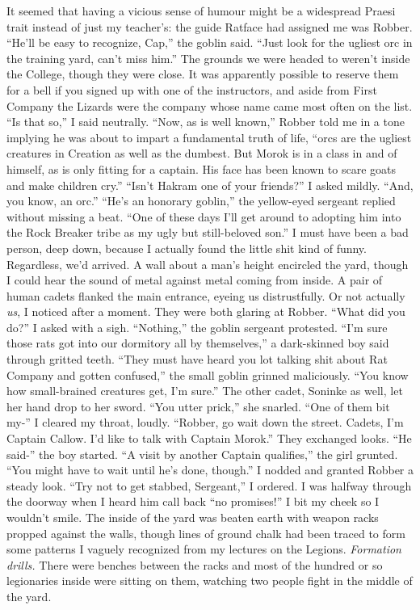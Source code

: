 \documentclass[12pt, openany]{book}
\begin{document}
It seemed that having a vicious sense of humour might be a widespread Praesi trait instead of just my teacher’s: the guide Ratface had assigned me was Robber.
“He’ll be easy to recognize, Cap,” the goblin said. “Just look for the ugliest orc in the training yard, can’t miss him.”
The grounds we were headed to weren’t inside the College, though they were close. It was apparently possible to reserve them for a bell if you signed up with one of the instructors, and aside from First Company the Lizards were the company whose name came most often on the list.
“Is that so,” I said neutrally.
“Now, as is well known,” Robber told me in a tone implying he was about to impart a fundamental truth of life, “orcs are the ugliest creatures in Creation as well as the dumbest. But Morok is in a class in and of himself, as is only fitting for a captain. His face has been known to scare goats and make children cry.”
“Isn’t Hakram one of your friends?” I asked mildly. “And, you know, an orc.”
“He’s an honorary goblin,” the yellow-eyed sergeant replied without missing a beat. “One of these days I’ll get around to adopting him into the Rock Breaker tribe as my ugly but still-beloved son.”
I must have been a bad person, deep down, because I actually found the little shit kind of funny. Regardless, we’d arrived. A wall about a man’s height encircled the yard, though I could hear the sound of metal against metal coming from inside. A pair of human cadets flanked the main entrance, eyeing us distrustfully. Or not actually \textit{us}, I noticed after a moment. They were both glaring at Robber.
“What did you do?” I asked with a sigh.
“Nothing,” the goblin sergeant protested.
“I’m sure those rats got into our dormitory all by themselves,” a dark-skinned boy said through gritted teeth.
“They must have heard you lot talking shit about Rat Company and gotten confused,” the small goblin grinned maliciously. “You know how small-brained creatures get, I’m sure.”
The other cadet, Soninke as well, let her hand drop to her sword.
“You utter prick,” she snarled. “One of them bit my-”
I cleared my throat, loudly. “Robber, go wait down the street. Cadets, I’m Captain Callow. I’d like to talk with Captain Morok.”
They exchanged looks. “He said-” the boy started.
“A visit by another Captain qualifies,” the girl grunted. “You might have to wait until he’s done, though.”
I nodded and granted Robber a steady look.
“Try not to get stabbed, Sergeant,” I ordered.
I was halfway through the doorway when I heard him call back “no promises!” I bit my cheek so I wouldn’t smile. The inside of the yard was beaten earth with weapon racks propped against the walls, though lines of ground chalk had been traced to form some patterns I vaguely recognized from my lectures on the Legions. \textit{Formation drills.} There were benches between the racks and most of the hundred or so legionaries inside were sitting on them, watching two people fight in the middle of the yard.
\end{document}
